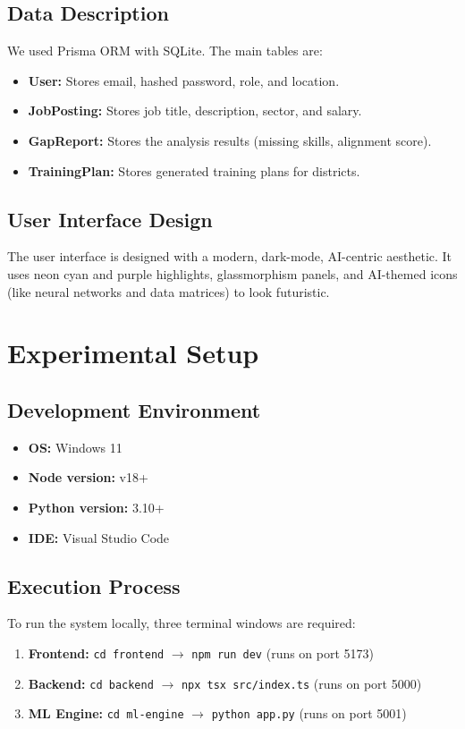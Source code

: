 \documentclass[12pt,a4paper]{report}
\begin{document}
\section{Data Description}
We used Prisma ORM with SQLite. The main tables are:
\begin{itemize}
    \item \textbf{User:} Stores email, hashed password, role, and location.
    \item \textbf{JobPosting:} Stores job title, description, sector, and salary.
    \item \textbf{GapReport:} Stores the analysis results (missing skills, alignment score).
    \item \textbf{TrainingPlan:} Stores generated training plans for districts.
\end{itemize}

\section{User Interface Design}
The user interface is designed with a modern, dark-mode, AI-centric aesthetic. It uses neon cyan and purple highlights, glassmorphism panels, and AI-themed icons (like neural networks and data matrices) to look futuristic.

\chapter{Experimental Setup}

\section{Development Environment}
\begin{itemize}
    \item \textbf{OS:} Windows 11
    \item \textbf{Node version:} v18+
    \item \textbf{Python version:} 3.10+
    \item \textbf{IDE:} Visual Studio Code
\end{itemize}

\section{Execution Process}
To run the system locally, three terminal windows are required:
\begin{enumerate}
    \item \textbf{Frontend:} \verb|cd frontend| $\rightarrow$ \verb|npm run dev| (runs on port 5173)
    \item \textbf{Backend:} \verb|cd backend| $\rightarrow$ \verb|npx tsx src/index.ts| (runs on port 5000)
    \item \textbf{ML Engine:} \verb|cd ml-engine| $\rightarrow$ \verb|python app.py| (runs on port 5001)
\end{enumerate}
\end{document}
